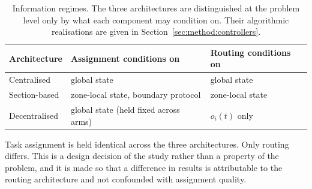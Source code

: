 \documentclass[../main.tex]{subfiles}
\begin{document}
\begin{table}[t]
  \centering
  \caption{Information regimes. The three architectures are distinguished at the
  problem level only by what each component may condition on. Their algorithmic
  realisations are given in Section~\ref{sec:method:controllers}.}
  \label{tab:information}
  \begin{tabular}{lll}
    \toprule
    Architecture & Assignment conditions on & Routing conditions on \\
    \midrule
    Centralised     & global state & global state \\
    Section-based   & zone-local state, boundary protocol & zone-local state \\
    Decentralised   & global state (held fixed across arms) & $o_i(t)$ only \\
    \bottomrule
  \end{tabular}
\end{table}

Task assignment is held identical across the three architectures. Only routing
differs. This is a design decision of the study rather than a property of the
problem, and it is made so that a difference in results is attributable to the
routing architecture and not confounded with assignment quality.
\end{document}
